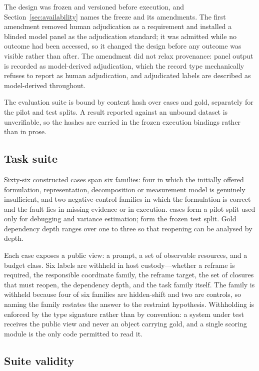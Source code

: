 The design was frozen and versioned before execution, and
Section~\ref{sec:availability} names the freeze and its amendments. The first
amendment removed human adjudication as a requirement and installed a blinded
model panel as the adjudication standard; it was admitted while no outcome had
been accessed, so it changed the design before any outcome was visible rather
than after. The amendment did not relax provenance: panel output is recorded as
model-derived adjudication, which the record type mechanically refuses to report
as human adjudication, and adjudicated labels are described as model-derived
throughout.

The evaluation suite is bound by content hash over cases and gold, separately for
the pilot and test splits. A result reported against an unbound dataset is
unverifiable, so the hashes are carried in the frozen execution bindings rather
than in prose.

\subsection{Task suite}

Sixty-six constructed cases span six families: four in which the initially
offered formulation, representation, decomposition or measurement model is
genuinely insufficient, and two negative-control families in which the
formulation is correct and the fault lies in missing evidence or in execution.
\PilotCaseCount{} cases form a pilot split used only for debugging and variance
estimation; \TestCaseCount{} form the frozen test split. Gold dependency depth
ranges over one to three so that reopening can be analysed by depth.

Each case exposes a public view: a prompt, a set of observable resources, and a
budget class. Six labels are withheld in host custody---whether a reframe is
required, the responsible coordinate family, the reframe target, the set of
closures that must reopen, the dependency depth, and the task family itself. The
family is withheld because four of six families are hidden-shift and two are
controls, so naming the family restates the answer to the restraint hypothesis.
Withholding is enforced by the type signature rather than by convention: a system
under test receives the public view and never an object carrying gold, and a
single scoring module is the only code permitted to read it.

\subsection{Suite validity}

